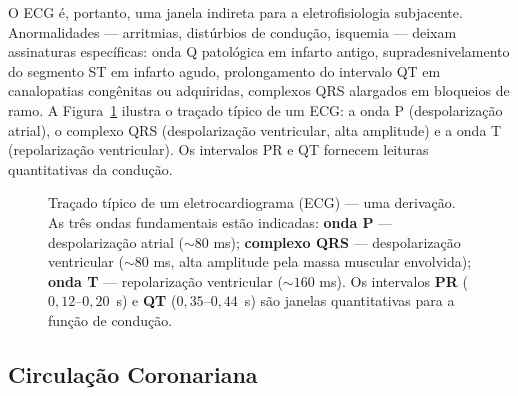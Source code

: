 O ECG é, portanto, uma janela indireta para a eletrofisiologia subjacente.
Anormalidades --- arritmias, distúrbios de condução, isquemia --- deixam
assinaturas específicas: onda Q patológica em infarto antigo, supradesnivelamento
do segmento ST em infarto agudo, prolongamento do intervalo QT em canalopatias
congênitas ou adquiridas, complexos QRS alargados em bloqueios de ramo.
A Figura~\ref{fig:12-ecg} ilustra o traçado típico de um ECG: a onda P
(despolarização atrial), o complexo QRS (despolarização ventricular,
alta amplitude) e a onda T (repolarização ventricular). Os intervalos
PR e QT fornecem leituras quantitativas da condução.

\begin{figure}[htbp]
\centering
{}
\caption{Traçado típico de um eletrocardiograma (ECG) --- uma derivação. As três ondas fundamentais estão indicadas: \textbf{onda P} --- despolarização atrial ($\sim 80$ ms); \textbf{complexo QRS} --- despolarização ventricular ($\sim 80$ ms, alta amplitude pela massa muscular envolvida); \textbf{onda T} --- repolarização ventricular ($\sim 160$ ms). Os intervalos \textbf{PR} ($0{,}12$--$0{,}20$~s) e \textbf{QT} ($0{,}35$--$0{,}44$~s) são janelas quantitativas para a função de condução.}
\label{fig:12-ecg}
\end{figure}

\subsection{Circulação Coronariana}
\label{sub:image12-coronarias}

